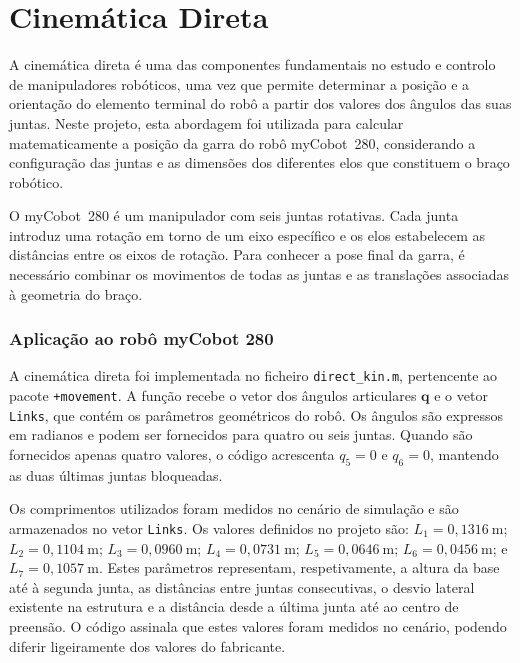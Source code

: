 \chapter{Cinemática Direta}
\label{sec:cinematica_direta}

A cinemática direta é uma das componentes fundamentais no estudo e controlo de manipuladores robóticos, uma vez que permite determinar a posição e a orientação do elemento terminal do robô a partir dos valores dos ângulos das suas juntas. Neste projeto, esta abordagem foi utilizada para calcular matematicamente a posição da garra do robô myCobot~280, considerando a configuração das juntas e as dimensões dos diferentes elos que constituem o braço robótico.

O myCobot~280 é um manipulador com seis juntas rotativas. Cada junta introduz uma rotação em torno de um eixo específico e os elos estabelecem as distâncias entre os eixos de rotação. Para conhecer a pose final da garra, é necessário combinar os movimentos de todas as juntas e as translações associadas à geometria do braço.

\subsection{Aplicação ao robô myCobot 280}

A cinemática direta foi implementada no ficheiro \texttt{direct\_kin.m}, pertencente ao pacote \texttt{+movement}. A função recebe o vetor dos ângulos articulares $\mathbf{q}$ e o vetor \texttt{Links}, que contém os parâmetros geométricos do robô. Os ângulos são expressos em radianos e podem ser fornecidos para quatro ou seis juntas. Quando são fornecidos apenas quatro valores, o código acrescenta $q_5=0$ e $q_6=0$, mantendo as duas últimas juntas bloqueadas.

Os comprimentos utilizados foram medidos no cenário de simulação e são armazenados no vetor \texttt{Links}. Os valores definidos no projeto são: $L_1=0{,}1316~\mathrm{m}$; $L_2=0{,}1104~\mathrm{m}$; $L_3=0{,}0960~\mathrm{m}$; $L_4=0{,}0731~\mathrm{m}$; $L_5=0{,}0646~\mathrm{m}$; $L_6=0{,}0456~\mathrm{m}$; e $L_7=0{,}1057~\mathrm{m}$. Estes parâmetros representam, respetivamente, a altura da base até à segunda junta, as distâncias entre juntas consecutivas, o desvio lateral existente na estrutura e a distância desde a última junta até ao centro de preensão. O código assinala que estes valores foram medidos no cenário, podendo diferir ligeiramente dos valores do fabricante.

